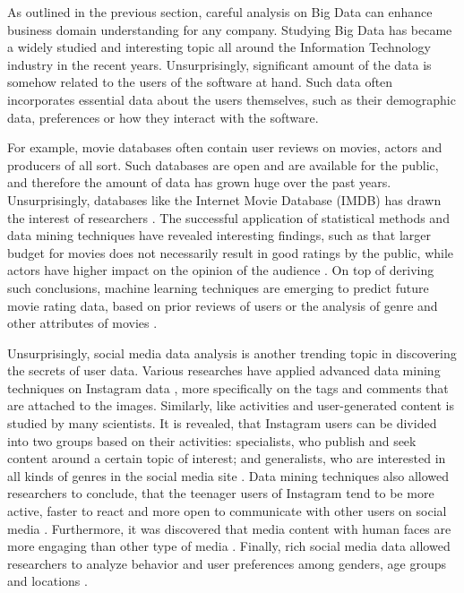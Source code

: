 As outlined in the previous section, careful analysis on Big Data can enhance business domain understanding for any company. Studying Big Data has became a widely studied and interesting topic all around the Information Technology industry in the recent years. Unsurprisingly, significant amount of the data is somehow related to the users of the software at hand. Such data often incorporates essential data about the users themselves, such as their demographic data, preferences or how they interact with the software.      

For example, movie databases often contain user reviews on movies, actors and producers of all sort. Such databases are open and are available for the public, and therefore the amount of data has grown huge over the past years. Unsurprisingly, databases like the Internet Movie Database (IMDB) has drawn the interest of researchers \cite{saraee2004data, kabinsingha2012movie, sumathi2013performance}. The successful application of statistical methods and data mining techniques have revealed interesting findings, such as that larger budget for movies does not necessarily result in good ratings by the public, while actors have higher impact on the opinion of the audience \cite{saraee2004data}. On top of deriving such conclusions, machine learning techniques are emerging to predict future movie rating data, based on prior reviews of users \cite{saraee2004data} or the analysis of genre and other attributes of movies \cite{kabinsingha2012movie}.

Unsurprisingly, social media data analysis is another trending topic in discovering the secrets of user data. Various researches have applied advanced data mining techniques on Instagram data \cite{jang2015noreciprocity, bakhshi2014faces, hu2014we, jang2016teensengagemorewithfewerphotos, han2016teensarefrommars}, more specifically on the tags and comments that are attached to the images. Similarly, like activities and user-generated content is studied by many scientists. It is revealed, that Instagram users can be divided into two groups based on their activities: specialists, who publish and seek content around a certain topic of interest; and generalists, who are interested in all kinds of genres in the social media site \cite{jang2015noreciprocity}. Data mining techniques also allowed researchers to conclude, that the teenager users of Instagram tend to be more active, faster to react and more open to communicate with other users on social media \cite{jang2016teensengagemorewithfewerphotos, han2016teensarefrommars}. Furthermore, it was discovered that media content with human faces are more engaging than other type of media \cite{bakhshi2014faces}. Finally, rich social media data allowed researchers to analyze behavior and user preferences among genders, age groups and locations \cite{farseev2015harvestingmultiplesources}.

